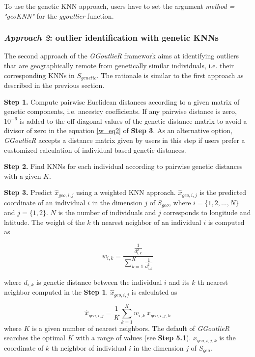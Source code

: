 \documentclass[11pt]{article}
\begin{document}
To use the genetic KNN approach, users have to set the argument \textit{method = "geoKNN"} for the \textit{ggoutlier} function.

\subsubsection*{\textit{Approach 2}: outlier identification with genetic KNNs}

The second approach of the \textit{GGoutlieR} framework aims at identifying outliers that are geographically remote from genetically similar individuals, i.e. their corresponding KNNs in $S_{genetic}$. 
The rationale is similar to the first approach as described in the previous section.

\textbf{Step 1.} Compute pairwise Euclidean distances according to a given matrix of genetic components, i.e. ancestry coefficients. 
If any pairwise distance is zero, $10^{-6}$ is added to the off-diagonal values of the genetic distance matrix to avoid a divisor of zero in the equation \ref{w_eq2} of \textbf{Step 3}. As an alternative option, \textit{GGoutlieR} accepts a distance matrix given by users in this step if users prefer a customized calculation of individual-based genetic distances.

\textbf{Step 2.} Find KNNs for each individual according to pairwise genetic distances with a given $K$.

\textbf{Step 3.} Predict $\hat{x}_{geo,i,j}$ using a weighted KNN approach.
$\hat{x}_{geo,i,j}$ is the predicted coordinate of an individual $i$ in the dimension $j$ of $S_{geo}$, where $i = \{1,2,...,N\}$ and $j = \{1,2\}$. 
$N$ is the number of individuals and $j$ corresponds to longitude and latitude. 
The weight of the $k$ th nearest neighbor of an individual $i$ is computed as

\begin{equation} \label{w_eq2}
w_{i,k}=\frac{\frac{1}{d_{i,k}^2}}{\sum_{k=1}^{K} \frac{1}{d_{i,k}^2}}
\end{equation}

where $d_{i,k}$ is genetic distance between the individual $i$ and its $k$ th nearest neighbor computed in the \textbf{Step 1}.
$\hat{x}_{geo,i,j}$ is calculated as

\begin{equation} \label{wknn_eq2}
\hat{x}_{geo,i,j}=\frac{1}{K}\sum_{k=1}^{K}w_{i,k}\ x_{geo,i,j,k}
\end{equation}
where $K$ is a given number of nearest neighbors.
The default of \textit{GGoutlieR} searches the optimal $K$ with a range of values (see \textbf{Step 5.1}).
$x_{geo,i,j,k}$ is the coordinate of $k$ th neighbor of individual $i$ in the dimension $j$ of $S_{geo}$.
\end{document}
